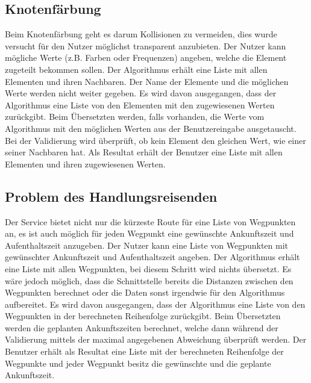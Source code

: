 %
%
%
%

\subsection{Knotenfärbung}
Beim Knotenfärbung geht es darum Kollisionen zu vermeiden, dies wurde versucht für den Nutzer möglichst transparent anzubieten. Der Nutzer kann mögliche Werte (z.B. Farben oder 
Frequenzen) angeben, welche die Element zugeteilt bekommen sollen. Der Algorithmus erhält eine Liste mit allen Elementen und ihren Nachbaren. Der Name der Elemente und die möglichen 
Werte werden nicht weiter gegeben. Es wird davon ausgegangen, dass der Algorithmus eine Liste von den Elementen mit den zugewiesenen Werten zurückgibt. Beim Übersetzten werden, falls 
vorhanden, die Werte vom Algorithmus mit den möglichen Werten aus der Benutzereingabe ausgetauscht. Bei der Validierung wird überprüft, ob kein Element den gleichen Wert, wie einer 
seiner Nachbaren hat. Als Resultat erhält der Benutzer eine Liste mit allen Elementen und ihren zugewiesenen Werten.

%
%
%
%

\subsection{Problem des Handlungsreisenden}
Der Service bietet nicht nur die kürzeste Route für eine Liste von Wegpunkten an, es ist auch möglich für jeden Wegpunkt eine gewünschte Ankunftszeit und Aufenthaltszeit anzugeben. Der 
Nutzer kann eine Liste von Wegpunkten mit gewünschter Ankunftszeit und Aufenthaltszeit angeben. Der Algorithmus erhält eine Liste mit allen Wegpunkten, bei diesem Schritt wird nichts 
übersetzt. Es wäre jedoch möglich, dass die Schnittstelle bereits die Distanzen zwischen den Wegpunkten berechnet oder die Daten sonst irgendwie für den Algorithmus aufbereitet. Es wird 
davon ausgegangen, dass der Algorithmus eine Liste von den Wegpunkten in der berechneten Reihenfolge zurückgibt. Beim Übersetzten werden die geplanten Ankunftszeiten berechnet, 
welche dann während der Validierung mittels der maximal angegebenen Abweichung überprüft werden. Der Benutzer erhält als Resultat eine Liste mit der berechneten Reihenfolge der 
Wegpunkte und jeder Wegpunkt besitz die gewünschte und die geplante Ankunftszeit.

%
%
%
%

